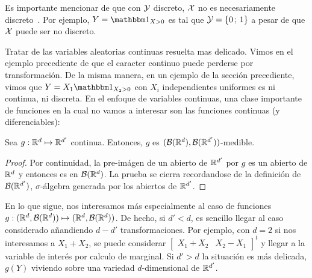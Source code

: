 Es  importante mencionar de  que con  $\mathcal{Y}$ discreto,  $\mathcal{X}$ no  es necesariamente
discreto~\cite{AthLah06}. Por ejemplo, $Y = \un_{X>0}$  es tal que $\mathcal{Y} = \{ 0 \,
; \, 1 \}$ a pesar de que $\mathcal{X}$ puede ser no discreto.

Tratar de las variables aleatorias  continuas resuelta mas delicado. Vimos en el
ejemplo   precediente  de   que  el   caracter  continuo   puede   perderse  por
transformaci\'on. De la misma manera, en un ejemplo de la secci\'on precediente,
vimos  que  $Y =  X_1  \un_{X_2>0}$ con  $X_i$  independientes  uniformes es  ni
continua,  ni  discreta.  En  el  enfoque  de  variables  continuas,  una  clase
importante  de funciones  en la  cual  no vamos  a interesar  son las  funciones
continuas (y diferenciables):
%
\begin{lema}
\label{Lem:MP:ContinuidadCaracterMedible}
%
  Sea   $g:   \mathbb{R}^d   \mapsto   \mathbb{R}^{d'}$   continua.   Entonces,   $g$   es
  $(\mathcal{B}(\mathbb{R}^d),\mathcal{B}(\mathbb{R}^{d'}))$-medible.
\end{lema}
%
\begin{proof}
  Por continuidad,  la pre-im\'agen de  un abierto de  $\mathbb{R}^{d'}$ por $g$  es un
  abierto  de $\mathbb{R}^d$  y entonces  es en  $\mathcal{B}(\mathbb{R}^d)$. La  prueba  se cierra
  recordandose  de  la   definici\'on  de  $\mathcal{B}(\mathbb{R}^{d'})$,  $\sigma$-\'algebra
  generada por los abiertos de $\mathbb{R}^{d'}$.
\end{proof}

En lo  que sigue, nos interesamos  m\'as especialmente al caso  de funciones $g:
(\mathbb{R}^d ,  \mathcal{B}(\mathbb{R}^d)) \mapsto (\mathbb{R}^d ,  \mathcal{B}(\mathbb{R}^d))$.  De hecho,  si $d' <
d$,   es    sencillo   llegar   al   caso    considerado   a\~nandiendo   $d-d'$
transformaciones. Por ejemplo, con $d = 2$  si nos interesamos a $X_1 + X_2$, se
puede considerar $\begin{bmatrix} X_1 + X_2 & X_2 - X_1\end{bmatrix}^t$ y llegar
a la variable de  inter\'es por calculo de marginal. Si $d'  > d$ la situaci\'on
es  m\'as  delicada,  $g(Y)$  viviendo  sobre una  variedad  $d$-dimensional  de
$\mathbb{R}^{d'}$.

